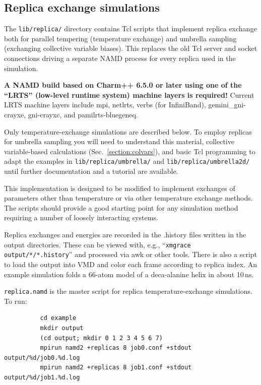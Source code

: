 \subsection{Replica exchange simulations}

The {\tt lib/replica/}
directory contains Tcl scripts that implement replica exchange
both for parallel tempering (temperature exchange) and
umbrella sampling (exchanging collective variable biases).
This replaces the old Tcl server and socket connections driving a
separate NAMD process for every replica used in the simulation.

{\bf A NAMD build based on Charm++ 6.5.0 or later using one of the
``LRTS'' (low-level runtime system) machine layers is required!}
Current LRTS machine layers include mpi, netlrts, verbs (for InfiniBand),
gemini\_gni-crayxe, gni-crayxc, and pamilrts-bluegeneq.

Only temperature-exchange simulations are described below.
To employ replicas for umbrella sampling you will need to understand
this material, collective variable-based calculations (Sec.\ \ref{section:colvars}),
and basic Tcl programming to adapt the examples in {\tt lib/replica/umbrella/}
and {\tt lib/replica/umbrella2d/} until further
documentation and a tutorial are available.

This implementation is designed to be modified to implement
exchanges of parameters other than temperature or via other temperature
exchange methods.  The scripts should provide a good starting point for
any simulation method requiring a number of loosely interacting systems.

Replica exchanges and energies are recorded in the .history files
written in the output directories.  These can be viewed with, e.g.,
``{\tt xmgrace output/*/*.history}'' and processed via awk or other tools.
There is also a script to load the output into VMD and color each
frame according to replica index.  An example simulation folds
a 66-atom model of a deca-alanine helix in about 10\,ns.

{\tt replica.namd}
is the master script for replica temperature-exchange simulations.  To run:
\begin{verbatim}
          cd example
          mkdir output
          (cd output; mkdir 0 1 2 3 4 5 6 7)
          mpirun namd2 +replicas 8 job0.conf +stdout output/%d/job0.%d.log
          mpirun namd2 +replicas 8 job1.conf +stdout output/%d/job1.%d.log
\end{verbatim}

